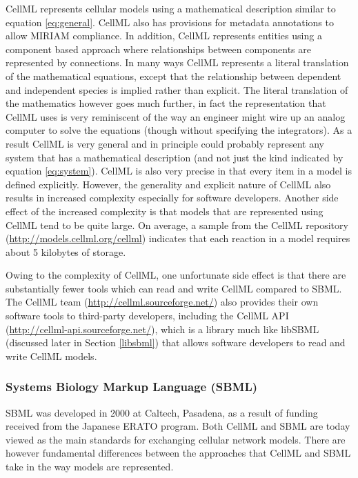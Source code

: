 CellML \autocite{LloydCellML2004} represents cellular models using a
mathematical description similar to equation \ref{eq:general}. CellML
also has provisions for metadata annotations to allow MIRIAM compliance.
In addition, CellML represents entities using a component based approach
where relationships between components are represented by connections.
In many ways CellML represents a literal translation of the mathematical
equations, except that the relationship between dependent and
independent species is implied rather than explicit. The literal
translation of the mathematics however goes much further, in fact the
representation that CellML uses is very reminiscent of the way an
engineer might wire up an analog computer to solve the equations (though
without specifying the integrators). As a result CellML is very general
and in principle could probably represent any system that has a
mathematical description (and not just the kind indicated by equation
\ref{eq:system}). CellML is also very precise in that every item in a
model is defined explicitly. However, the generality and explicit nature
of CellML also results in increased complexity especially for software
developers. Another side effect of the increased complexity is that
models that are represented using CellML tend to be quite large. On
average, a sample from the CellML repository
(\url{http://models.cellml.org/cellml}) indicates that each reaction in
a model requires about 5 kilobytes of storage.

Owing to the complexity of CellML, one unfortunate side effect is that
there are substantially fewer tools which can read and write CellML
compared to SBML. The CellML team (\url{http://cellml.sourceforge.net/})
also provides their own software tools to third-party developers,
including the CellML API (\url{http://cellml-api.sourceforge.net/}),
which is a library much like libSBML (discussed later in Section
\ref{libsbml}) that allows software developers to read and write CellML
models.

\subsubsection{Systems Biology Markup Language (SBML)}

SBML was developed in 2000 at Caltech, Pasadena, as a result of funding
received from the Japanese ERATO program. Both CellML and SBML are today
viewed as the main standards for exchanging cellular network models.
There are however fundamental differences between the approaches that
CellML and SBML take in the way models are represented.

